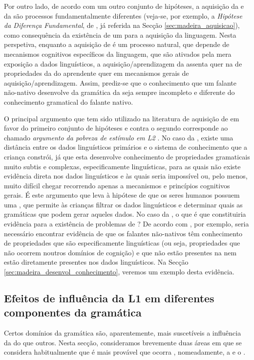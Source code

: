 \documentclass[output=paper]{LSP/langsci}
\begin{document}
Por outro lado, de acordo com um outro conjunto de hipóteses, a aquisição da  e da  são processos fundamentalmente diferentes (veja-se, por exemplo, a \textit{Hipótese da Diferença Fundamental}, de \citealt{bley-vroman1989}, já referida na Secção \ref{sec:madeira_aquisicao}), como consequência da existência de um  para a aquisição da linguagem. Nesta perspetiva, enquanto a aquisição de  é um processo natural, que depende de mecanismos cognitivos específicos da linguagem, que são ativados pela mera exposição a dados linguísticos, a aquisição/aprendizagem da  assenta quer na  de propriedades da  do aprendente quer em mecanismos gerais de aquisição/aprendizagem. Assim, prediz-se que o conhecimento que um falante não-nativo desenvolve da gramática da  seja sempre incompleto e diferente do conhecimento gramatical do falante nativo.

O principal argumento que tem sido utilizado na literatura de aquisição de  em favor do primeiro conjunto de hipóteses e contra o segundo corresponde ao chamado \textit{argumento da pobreza de estímulo em L2} \citep{schwartzsprouse2013}. No caso da , existe uma distância entre os dados linguísticos primários e o sistema de conhecimento que a criança constrói, já que esta desenvolve conhecimento de propriedades gramaticais muito subtis e complexas, especificamente linguísticas, para as quais não existe evidência direta nos dados linguísticos e às quais seria impossível ou, pelo menos, muito difícil chegar recorrendo apenas a mecanismos e princípios cognitivos gerais. É este argumento que leva à hipótese de que os seres humanos possuem uma , que permite às crianças filtrar os dados linguísticos e determinar quais as gramáticas que podem gerar aqueles dados. No caso da , o que é que constituiria evidência para a existência de problemas de ? De acordo com \citet{white2003}, por exemplo, seria necessário encontrar evidência de que os falantes não-nativos têm conhecimento de propriedades que são especificamente linguísticas (ou seja, propriedades que não ocorrem noutros domínios de cognição) e que não estão presentes na  nem estão diretamente presentes nos dados linguísticos. Na Secção \ref{sec:madeira_desenvol_conhecimento}, veremos um exemplo desta evidência.


\subsection{Efeitos de influência da L1 em diferentes componentes da gramática}
\label{subsec:madeira_efeitos_influencia}
Certos domínios da gramática são, aparentemente, mais suscetíveis a influência da  do que outros. Nesta secção, consideramos brevemente duas áreas em que se considera habitualmente que é mais provável que ocorra , nomeadamente, a  e o .
\end{document}

